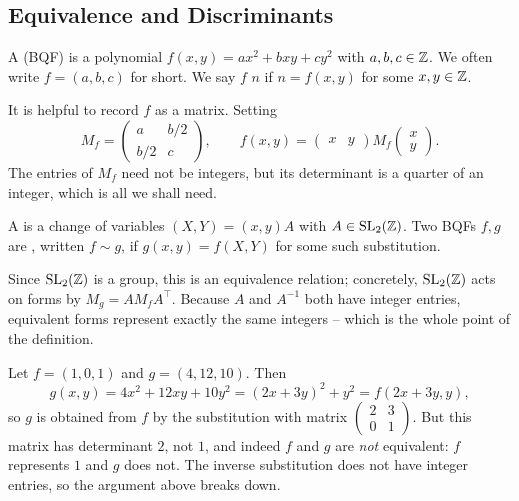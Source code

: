\documentclass[a4paper]{scrartcl}
\begin{document}
\subsection{Equivalence and Discriminants}

\begin{definition}
	A  (BQF) is a polynomial $f(x,y) = ax^2 + bxy + cy^2$ with $a, b, c \in \mathbb{Z}$. We often write $f = (a,b,c)$ for short. We say $f$  $n$ if $n = f(x,y)$ for some $x, y \in \mathbb{Z}$.
\end{definition}

It is helpful to record $f$ as a matrix. Setting
$$
M_f = \begin{pmatrix} a & b/2 \\ b/2 & c\end{pmatrix}, \qquad f(x,y) = \begin{pmatrix} x & y \end{pmatrix} M_f \begin{pmatrix} x \\ y\end{pmatrix}.
$$
The entries of $M_f$ need not be integers, but its determinant is a quarter of an integer, which is all we shall need.

\begin{definition}
	A  is a change of variables $(X, Y) = (x, y)A$ with $A \in \operatorname{SL}_2(\mathbb{Z})$. Two BQFs $f, g$ are , written $f \sim g$, if $g(x,y) = f(X, Y)$ for some such substitution.
\end{definition}

Since $\operatorname{SL}_2(\mathbb{Z})$ is a group, this is an equivalence relation; concretely, $\operatorname{SL}_2(\mathbb{Z})$ acts on forms by $M_g = A M_f A^\intercal$. Because $A$ and $A^{-1}$ both have integer entries, equivalent forms represent exactly the same integers -- which is the whole point of the definition.

\begin{example}
	Let $f = (1, 0, 1)$ and $g = (4, 12, 10)$. Then
	$$
	g(x,y) = 4x^2 + 12xy + 10y^2 = (2x + 3y)^2 + y^2 = f(2x + 3y, y),
	$$
	so $g$ is obtained from $f$ by the substitution with matrix $\left(\begin{smallmatrix} 2 & 3 \\ 0 & 1\end{smallmatrix}\right)$. But this matrix has determinant $2$, not $1$, and indeed $f$ and $g$ are \emph{not} equivalent: $f$ represents $1$ and $g$ does not. The inverse substitution does not have integer entries, so the argument above breaks down.
\end{example}
\end{document}
